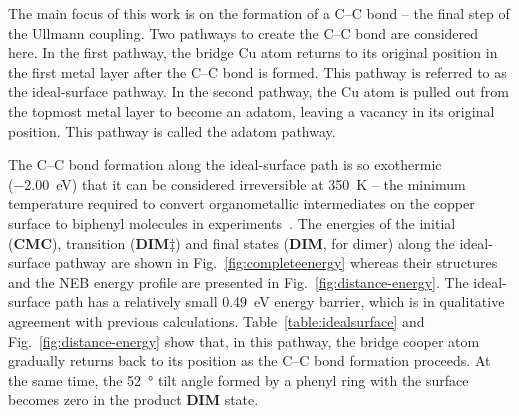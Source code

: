 \documentclass[aps,prb,amsmath,amssymb,11pt]{revtex4-1}
\begin{document}

The main focus of this work is on the formation of a C--C bond -- the final step of the Ullmann coupling. 
Two pathways to create the C--C bond are considered here. 
In the first pathway, the bridge Cu atom returns to its original position in the first metal layer after the C--C bond is formed. This pathway is referred to as the ideal-surface pathway.
In the second pathway, the Cu atom is pulled out from the topmost metal layer to become an adatom, leaving a vacancy in its original position. This pathway is called the adatom pathway.

The C--C bond formation along the ideal-surface path is so exothermic (\SI{-2.00}{\electronvolt}) that it can be considered irreversible at \SI{350}{\kelvin} -- the minimum temperature required to convert organometallic intermediates on the copper surface to biphenyl molecules in experiments~\cite{ullmann_67, sur_sci01}. The energies of the initial (\textbf{CMC}), transition (\textbf{DIM$\ddagger$}) and final states (\textbf{DIM}, for dimer) along the ideal-surface pathway are shown in Fig.~\ref{fig:completeenergy} whereas their structures and the NEB energy profile are presented in Fig.~\ref{fig:distance-energy}. 
The ideal-surface path has a relatively small \SI{0.49}{\electronvolt} energy barrier, which is in qualitative agreement with previous calculations. %
Table~\ref{table:idealsurface} and Fig.~\ref{fig:distance-energy} show that, in this pathway, the bridge cooper atom gradually returns back to its position as the C--C bond formation proceeds. At the same time, the \SI{52}{\degree} tilt angle formed by a phenyl ring with the surface becomes zero in the product \textbf{DIM} state.
\end{document}
